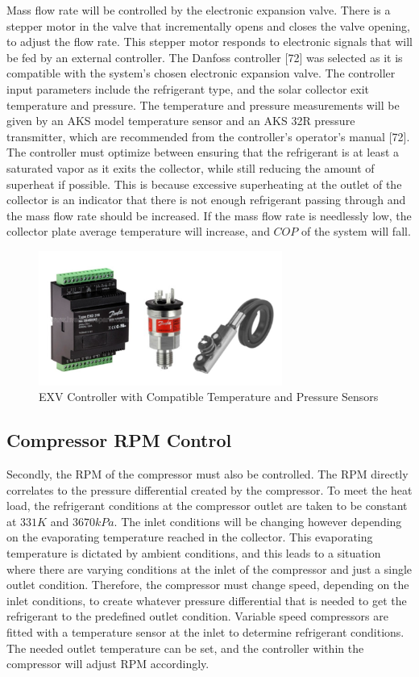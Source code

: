 \medskip
Mass flow rate will be controlled by the electronic expansion valve. There is a stepper motor in the valve that incrementally opens and closes the valve opening, to adjust the flow rate. This stepper motor responds to electronic signals that will be fed by an external controller. The Danfoss controller [72] was selected as it is compatible with the system’s chosen electronic expansion valve. The controller input parameters include the refrigerant type, and the solar collector exit temperature and pressure. The temperature and pressure measurements will be given by an AKS model temperature sensor and an AKS 32R pressure transmitter, which are recommended from the controller’s operator’s manual [72]. The controller must optimize between ensuring that the refrigerant is at least a saturated vapor as it exits the collector, while still reducing the amount of superheat if possible. This is because excessive superheating at the outlet of the collector is an indicator that there is not enough refrigerant passing through and the mass flow rate should be increased. If the mass flow rate is needlessly low, the collector plate average temperature will increase, and $COP$ of the system will fall.

\begin{figure}[H]
    \centering
    \includegraphics[width=8cm]{images/control_sensors.png}
    \caption{EXV Controller with Compatible Temperature and Pressure Sensors}
\end{figure}

\subsection{Compressor RPM Control}

Secondly, the RPM of the compressor must also be controlled. The RPM directly correlates to the pressure differential created by the compressor. To meet the heat load, the refrigerant conditions at the compressor outlet are taken to be constant at $331K$ and $3670 kPa$. The inlet conditions will be changing however depending on the evaporating temperature reached in the collector. This evaporating temperature is dictated by ambient conditions, and this leads to a situation where there are varying conditions at the inlet of the compressor and just a single outlet condition. Therefore, the compressor must change speed, depending on the inlet conditions, to create whatever pressure differential that is needed to get the refrigerant to the predefined outlet condition. Variable speed compressors are fitted with a temperature sensor at the inlet to determine refrigerant conditions. The needed outlet temperature can be set, and the controller within the compressor will adjust RPM accordingly.